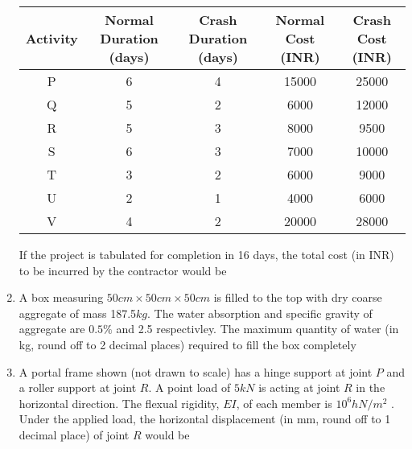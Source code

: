 \documentclass[journal,12pt,onecolumn]{IEEEtran}
\theoremstyle{remark}
\begin{document}
\begin{enumerate}
        \begin{tabular}{|c|c|c|c|c|}
                \hline
                Activity & Normal Duration (days) & Crash Duration (days) & Normal Cost (INR) & Crash Cost (INR)\\
                \hline
                P & 6 & 4 & 15000 & 25000\\
                \hline
                Q & 5 & 2 & 6000 & 12000\\
                \hline
                R & 5 & 3 & 8000 & 9500\\
                \hline
                S & 6 & 3 & 7000 & 10000\\
                \hline
                T & 3 & 2 & 6000 & 9000\\
                \hline
                U & 2 & 1 & 4000 & 6000\\
                \hline
                V & 4 & 2 & 20000 & 28000\\
                \hline

            

        \end{tabular}
        If the project is tabulated for completion in 16 days, the total cost (in INR) to be incurred 
        by the contractor would be
        \hfill{}
        
    \item A box measuring $50cm \times 50cm \times 50cm$ is filled to the top with dry coarse
        aggregate of mass 187.5$kg$. The water absorption and specific gravity of aggregate are 
        $0.5\%$ and 2.5 respectivley. The maximum quantity of water (in kg, round off to 2 decimal places)
        required to fill the box completely
        \hfill{}
         
    \item A portal frame shown (not drawn to scale) has a hinge support at joint $P$ and a roller
        support at joint $R$. A point load of $5kN$ is acting at joint $R$ in the horizontal direction. 
        The flexual rigidity, $EI$, of each member is $10^6 hN/m^2$ . Under the applied load, the horizontal
        displacement (in mm, round off to 1 decimal place) of joint $R$ would be
        \begin{center}
            \resizebox{0.3\textwidth}{!}{
                
            } 
        \end{center}
        \hfill{}

    
\end{enumerate}
\end{document}
